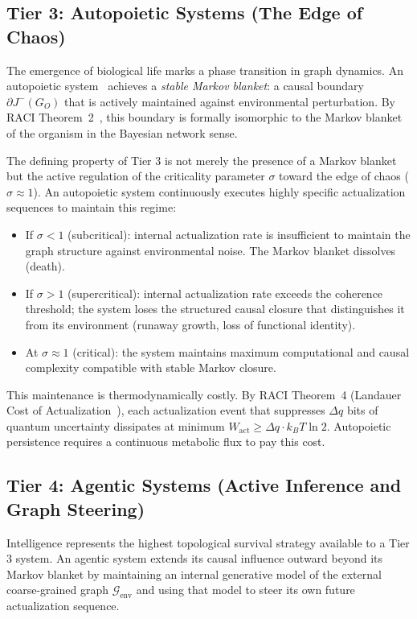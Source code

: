 \documentclass[11pt,a4paper]{article}
\theoremstyle{remark}
\newcommand{\GG}{\mathcal{G}}
\newcommand{\sigmaedge}{\sigma}
\begin{document}
\subsection{Tier 3: Autopoietic Systems (The Edge of Chaos)}

The emergence of biological life marks a phase transition in graph dynamics. An
autopoietic system~\citep{Maturana1980} achieves a \emph{stable Markov blanket}:
a causal boundary $\partial J^-(G_O)$ that is actively maintained against
environmental perturbation. By RACI Theorem~2~\citep{Sandeman2026c}, this
boundary is formally isomorphic to the Markov blanket of the organism in the
Bayesian network sense.

The defining property of Tier 3 is not merely the presence of a Markov blanket
but the active regulation of the criticality parameter $\sigmaedge$ toward the
edge of chaos ($\sigmaedge \approx 1$). An autopoietic system continuously executes
highly specific actualization sequences to maintain this regime:
\begin{itemize}[noitemsep]
  \item If $\sigmaedge < 1$ (subcritical): internal actualization rate is insufficient
    to maintain the graph structure against environmental noise. The Markov blanket
    dissolves (death).
  \item If $\sigmaedge > 1$ (supercritical): internal actualization rate exceeds
    the coherence threshold; the system loses the structured causal closure that
    distinguishes it from its environment (runaway growth, loss of functional
    identity).
  \item At $\sigmaedge \approx 1$ (critical): the system maintains maximum
    computational and causal complexity compatible with stable Markov closure.
\end{itemize}

This maintenance is thermodynamically costly. By RACI Theorem~4 (Landauer Cost
of Actualization~\citep{Sandeman2026c}), each actualization event that suppresses
$\Delta q$ bits of quantum uncertainty dissipates at minimum
$W_{\mathrm{act}} \geq \Delta q \cdot k_BT \ln 2$. Autopoietic persistence
requires a continuous metabolic flux to pay this cost.

\subsection{Tier 4: Agentic Systems (Active Inference and Graph Steering)}

Intelligence represents the highest topological survival strategy available to a
Tier 3 system. An agentic system extends its causal influence outward beyond its
Markov blanket by maintaining an internal generative model of the external
coarse-grained graph $\GG_{\mathrm{env}}$ and using that model to steer its own
future actualization sequence.
\end{document}

